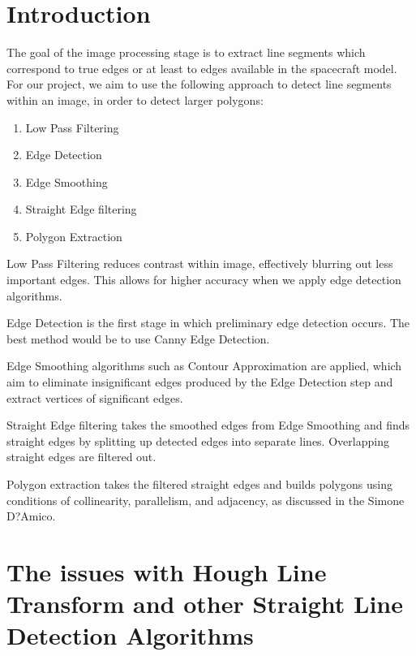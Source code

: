 \documentclass[12pt]{article}
\begin{document}
\maketitle

\section{Introduction}

\noindent The goal of the image processing stage is to extract line segments which correspond
to true edges or at least to edges available in the spacecraft model.
For our project, we aim to use the following approach to detect line segments
within an image, in order to detect larger polygons:

\begin{enumerate}
\item Low Pass Filtering
\item Edge Detection
\item Edge Smoothing
\item Straight Edge filtering
\item Polygon Extraction
\end{enumerate}

\noindent Low Pass Filtering reduces contrast within image, effectively blurring out less important edges. This allows for higher accuracy when we apply edge detection algorithms. \newline

\noindent Edge Detection is the first stage in which preliminary edge detection occurs. The best method would be to use Canny Edge Detection. \newline

\noindent Edge Smoothing algorithms such as Contour Approximation are applied, which aim to eliminate insignificant edges produced by the Edge Detection step and extract vertices of significant edges. \newline

\noindent Straight Edge filtering takes the smoothed edges from Edge Smoothing and finds straight edges by splitting up detected edges into separate lines. Overlapping straight edges are filtered out.

\noindent Polygon extraction takes the filtered straight edges and builds polygons using conditions of collinearity, parallelism, and adjacency, as discussed in the Simone D?Amico.

\section{The issues with Hough Line Transform and other Straight Line Detection Algorithms}
\end{document}
